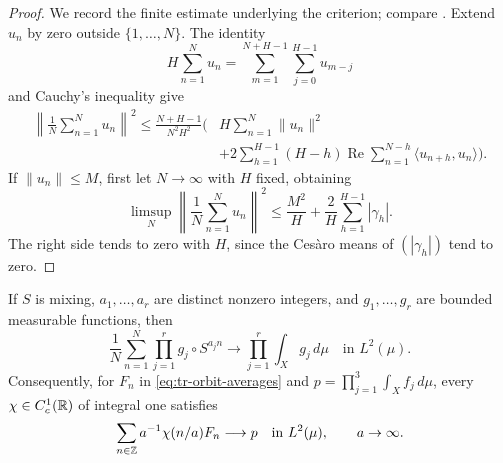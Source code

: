 \begin{proof}
We record the finite estimate underlying the criterion; compare
\cite[Lemma~D.1]{HostKra}.  Extend \(u_n\) by zero outside
\(\{1,\ldots,N\}\).  The identity
\[
 H\sum_{n=1}^Nu_n
 =\sum_{m=1}^{N+H-1}\sum_{j=0}^{H-1}u_{m-j}
\]
and Cauchy's inequality give
\begin{align*}
 \left\|\frac1N\sum_{n=1}^Nu_n\right\|^2
 \leq\frac{N+H-1}{N^2H^2}\bigg(&H\sum_{n=1}^N\|u_n\|^2\\
 &+2\sum_{h=1}^{H-1}(H-h)
      \operatorname{Re}\sum_{n=1}^{N-h}\langle u_{n+h},u_n\rangle
 \bigg).
\end{align*}
If \(\|u_n\|\leq M\), first let \(N\to\infty\) with \(H\)
fixed, obtaining
\[
 \limsup_N\left\|\frac1N\sum_{n=1}^Nu_n\right\|^2
 \leq\frac{M^2}{H}+\frac2H\sum_{h=1}^{H-1}|\gamma_h|.
\]
The right side tends to zero with \(H\), since the Ces\`aro means
of \((|\gamma_h|)\) tend to zero.
\end{proof}

\begin{lemma}
\label{lem:tr-norm}
If \(S\) is mixing, \(a_1,\ldots,a_r\) are distinct nonzero
integers, and \(g_1,\ldots,g_r\) are bounded measurable functions,
then
\begin{equation}
 \frac1N\sum_{n=1}^N\prod_{j=1}^rg_j\circ S^{a_jn}
 \longrightarrow\prod_{j=1}^r\int_Xg_j\,d\mu
 \quad\text{in }L^2(\mu).
 \label{eq:tr-norm}
\end{equation}
Consequently, for \(F_n\) in \eqref{eq:tr-orbit-averages} and
\(p=\prod_{j=1}^3\int_Xf_j\,d\mu\), every
\(\chi\in C_c^1(\mathbb R)\) of integral one satisfies
\begin{equation}
 \sum_{n\in\mathbb Z}a^{-1}\chi(n/a)F_n\longrightarrow p
 \quad\text{in }L^2(\mu),\qquad a\to\infty.
 \label{eq:tr-weighted-norm}
\end{equation}
\end{lemma}


